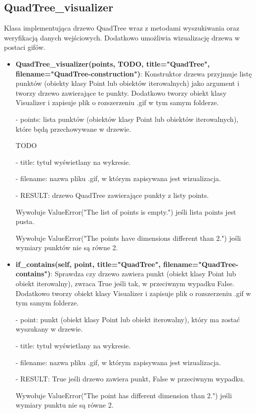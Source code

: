 \documentclass{lab}
\begin{document}
\subsection{QuadTree\_visualizer}
Klasa implementująca drzewo QuadTree wraz z metodami wyszukiwania oraz weryfikacją danych wejściowych. Dodatkowo umożliwia wizualizację drzewa w postaci gifów.
\begin{itemize}
  \item \textbf{QuadTree\_visualizer(points, TODO, title="QuadTree", filename="QuadTree-construction")}:
  Konstruktor drzewa przyjmuje listę punktów (obiekty klasy Point lub obiektów iterowalnych) jako argument i tworzy drzewo zawierające te punkty. Dodatkowo tworzy obiekt klasy Visualizer i zapisuje plik o rozszerzeniu .gif w tym samym folderze.

  - points: lista punktów (obiektów klasy Point lub obiektów iterowalnych), które będą przechowywane w drzewie.

  TODO

  - title: tytuł wyświetlany na wykresie.

  - filename: nazwa pliku .gif, w którym zapisywana jest wizualizacja.

  - RESULT: drzewo QuadTree zawierające punkty z listy points.

  Wywołuje ValueError("The list of points is empty.") jeśli lista points jest pusta.

  Wywołuje ValueError("The points have dimensions different than 2.") jeśli wymiary punktów nie są równe 2.

  \item \textbf{if\_contains(self, point, title="QuadTree", filename="QuadTree-contains")}:
  Sprawdza czy drzewo zawiera punkt (obiekt klasy Point lub obiekt iterowalny), zwraca True jeśli tak, w przeciwnym wypadku False. Dodatkowo tworzy obiekt klasy Visualizer i zapisuje plik o rozszerzeniu .gif w tym samym folderze.

  - point: punkt (obiekt klasy Point lub obiekt iterowalny), który ma zostać wyszukany w drzewie.

  - title: tytuł wyświetlany na wykresie.

  - filename: nazwa pliku .gif, w którym zapisywana jest wizualizacja.

  - RESULT: True jeśli drzewo zawiera punkt, False w przeciwnym wypadku.

  Wywołuje ValueError("The point has different dimension than 2.") jeśli wymiary punktu nie są równe 2.


\end{itemize}
\end{document}
